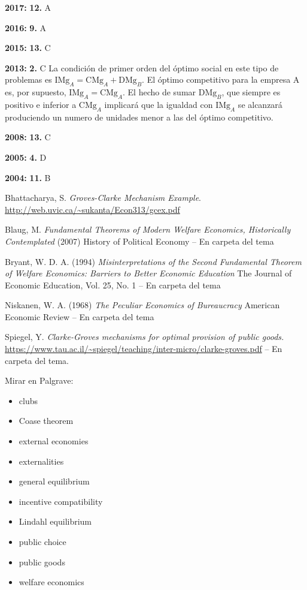 \documentclass{nuevotema}
\begin{document}
\notas

\textbf{2017:} \textbf{12.} A

\textbf{2016:} \textbf{9.} A

\textbf{2015:} \textbf{13.} C

\textbf{2013:} \textbf{2.} C La condición de primer orden del óptimo social en este tipo de problemas es $\text{IMg}_A = \text{CMg}_A + \text{DMg}_B$. El óptimo competitivo para la empresa A es, por supuesto, $\text{IMg}_A = \text{CMg}_A$. El hecho de sumar $\text{DMg}_B$, que siempre es positivo e inferior a $\text{CMg}_A$ implicará que la igualdad con $\text{IMg}_A$ se alcanzará produciendo un numero de unidades menor a las del óptimo competitivo. 

\textbf{2008:} \textbf{13.} C

\textbf{2005:} \textbf{4.} D

\textbf{2004:} \textbf{11.} B



\bibliografia

Bhattacharya, S. \textit{Groves-Clarke Mechanism Example}. \url{http://web.uvic.ca/~sukanta/Econ313/gcex.pdf}

Blaug, M. \textit{Fundamental Theorems of Modern Welfare Economics, Historically Contemplated} (2007) History of Political Economy -- En carpeta del tema

Bryant, W. D. A. (1994) \textit{Misinterpretations of the Second Fundamental Theorem of Welfare Economics: Barriers to Better Economic Education} The Journal of Economic Education, Vol. 25, No. 1 -- En carpeta del tema


Niskanen, W. A. (1968) \textit{The Peculiar Economics of Bureaucracy} American Economic Review -- En carpeta del tema

Spiegel, Y. \textit{Clarke-Groves mechanisms for optimal provision of public goods.} \url{https://www.tau.ac.il/~spiegel/teaching/inter-micro/clarke-groves.pdf} -- En carpeta del tema.

Mirar en Palgrave:
\begin{itemize} 
	\item clubs
	\item Coase theorem
	\item external economies
	\item externalities
	\item general equilibrium
	\item incentive compatibility
	\item Lindahl equilibrium
	\item public choice
	\item public goods
	\item welfare economics
\end{itemize}
\end{document}
